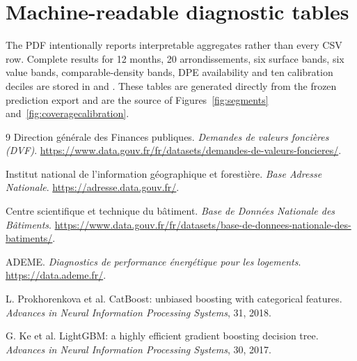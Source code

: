 \documentclass[11pt,a4paper]{article}
\begin{document}
\section{Machine-readable diagnostic tables}

The PDF intentionally reports interpretable aggregates rather than every CSV
row. Complete results for 12 months, 20 arrondissements, six surface bands, six
value bands, comparable-density bands, DPE availability and ten calibration
deciles are stored in 
and . These
tables are generated directly from the frozen prediction export and are the
source of Figures~\ref{fig:segments} and~\ref{fig:coveragecalibration}.

\begin{thebibliography}{9}
Direction g\'en\'erale des Finances publiques.
\emph{Demandes de valeurs fonci\`eres (DVF)}.
\url{https://www.data.gouv.fr/fr/datasets/demandes-de-valeurs-foncieres/}.

Institut national de l'information g\'eographique et foresti\`ere.
\emph{Base Adresse Nationale}.
\url{https://adresse.data.gouv.fr/}.

Centre scientifique et technique du b\^atiment.
\emph{Base de Donn\'ees Nationale des B\^atiments}.
\url{https://www.data.gouv.fr/fr/datasets/base-de-donnees-nationale-des-batiments/}.

ADEME. \emph{Diagnostics de performance \'energ\'etique pour les logements}.
\url{https://data.ademe.fr/}.

L. Prokhorenkova et al. CatBoost: unbiased boosting with categorical features.
\emph{Advances in Neural Information Processing Systems}, 31, 2018.

G. Ke et al. LightGBM: a highly efficient gradient boosting decision tree.
\emph{Advances in Neural Information Processing Systems}, 30, 2017.
\end{thebibliography}
\end{document}
